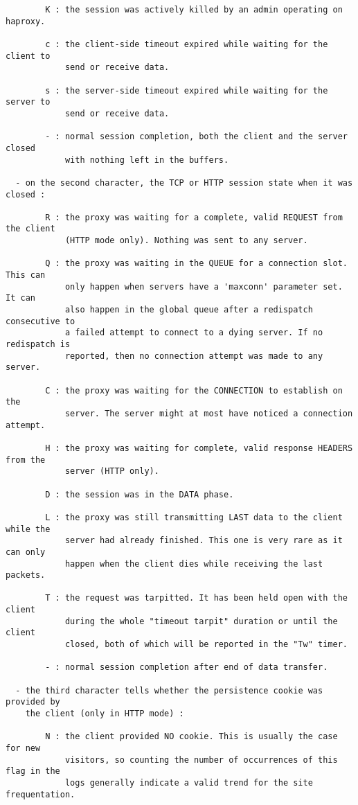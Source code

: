 \begin{verbatim}
        K : the session was actively killed by an admin operating on haproxy.

        c : the client-side timeout expired while waiting for the client to
            send or receive data.

        s : the server-side timeout expired while waiting for the server to
            send or receive data.

        - : normal session completion, both the client and the server closed
            with nothing left in the buffers.

  - on the second character, the TCP or HTTP session state when it was closed :

        R : the proxy was waiting for a complete, valid REQUEST from the client
            (HTTP mode only). Nothing was sent to any server.

        Q : the proxy was waiting in the QUEUE for a connection slot. This can
            only happen when servers have a 'maxconn' parameter set. It can
            also happen in the global queue after a redispatch consecutive to
            a failed attempt to connect to a dying server. If no redispatch is
            reported, then no connection attempt was made to any server.

        C : the proxy was waiting for the CONNECTION to establish on the
            server. The server might at most have noticed a connection attempt.

        H : the proxy was waiting for complete, valid response HEADERS from the
            server (HTTP only).

        D : the session was in the DATA phase.

        L : the proxy was still transmitting LAST data to the client while the
            server had already finished. This one is very rare as it can only
            happen when the client dies while receiving the last packets.

        T : the request was tarpitted. It has been held open with the client
            during the whole "timeout tarpit" duration or until the client
            closed, both of which will be reported in the "Tw" timer.

        - : normal session completion after end of data transfer.

  - the third character tells whether the persistence cookie was provided by
    the client (only in HTTP mode) :

        N : the client provided NO cookie. This is usually the case for new
            visitors, so counting the number of occurrences of this flag in the
            logs generally indicate a valid trend for the site frequentation.


\end{verbatim}
